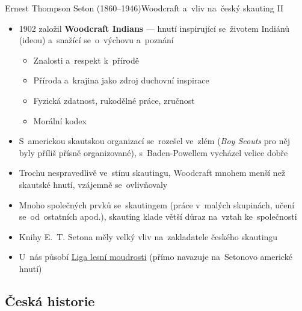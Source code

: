 \documentclass[compress, xelatex, 11pt, xcolor=dvipsnames, print, aspectratio=169,
	hyperref={
		bookmarks=true,
		unicode=true,
		colorlinks=true,
		pdftitle={Skautska vychovna metoda},
		plainpages=false,
		pdfauthor={Vojtech Zeisek},
		pdfsubject={Skautska vychovna metoda a jeji vyvoj za posledni stoleti a desetileti},
		pdfcreator={XeLaTeX},
		pdfkeywords={Junak, Pedagogika, Skaut, Skauting, Vychovna metoda},
		linkcolor=Red, %
		anchorcolor=ForestGreen, %
		citecolor=ForestGreen, %
		filecolor=ForestGreen, %
		menucolor=ForestGreen, %
		urlcolor=Sepia, %
		pdftex},
	url={hyphens, lowtilde} %
	]{beamer}
\begin{document}
\begin{frame}{Ernest Thompson Seton (1860--1946)}{Woodcraft a~vliv na~český skauting II}
	\begin{itemize}
		\item 1902 založil \textbf{Woodcraft Indians} --- hnutí inspirující se~životem Indiánů (ideou) a~snažící se~o~výchovu a~poznání
		\begin{itemize}
			\item Znalosti a~respekt k~přírodě
			\item Příroda a~krajina jako zdroj duchovní inspirace
			\item Fyzická zdatnost, rukodělné práce, zručnost
			\item Morální kodex
		\end{itemize}
		\item S~americkou skautskou organizací se~rozešel ve~zlém (\textit{Boy Scouts} pro něj byly příliš přísně organizované), s~Baden-Powellem vycházel velice dobře
		\item Trochu nespravedlivě ve~stínu skautingu, Woodcraft mnohem menší než skautské hnutí, vzájemně se~ovlivňovaly
		\item Mnoho společných prvků se~skautingem (práce v~malých skupinách, učení se~od~ostatních apod.), skauting klade větší důraz na~vztah ke~společnosti
		\item Knihy E.~T. Setona měly velký vliv na~zakladatele českého skautingu
		\item U~nás působí \href{https://www.woodcraft.cz/}{Liga lesní moudrosti} (přímo navazuje na~Setonovo americké hnutí)
	\end{itemize}
\end{frame}

\subsection{Česká historie}
\end{document}
